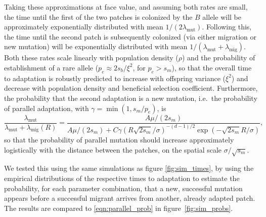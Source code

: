\documentclass{article}
\newcommand{\migrate}{\lambda_\text{mig}}
\newcommand{\mutrate}{\lambda_\text{mut}}
\begin{document}
Taking these approximations at face value, 
and assuming both rates are small, 
the time until the first of the two patches is colonized by the $B$
allele will be approximately exponentially distributed with mean $1/(2
\mutrate)$.
Following this, the time until the second patch is subsequently colonized 
(via either migration or new mutation) 
will be exponentially distributed with mean $1/(\mutrate+\migrate)$.
Both these rates scale linearly with population density ($\rho$) 
and the probability of establishment of a rare allele ($p_e\approx 2 s_b/\xi^2$, for $p_e>s_m$),
so that the overall time to adaptation is robustly predicted to increase with offspring variance ($\xi^2$)
and decrease with population density and beneficial selection coefficient.
Furthermore, the probability that the second adaptation is a new mutation,
i.e.\ the probability of parallel adaptation, 
with $\gamma = \min(1,s_m/p_e)$,
is 
\begin{equation} \label{eqn:parallel_prob}
    \frac{\mutrate}{\mutrate+\migrate(R)} = \frac{ A \mu / (2s_m) }{ A \mu / (2s_m) + C \gamma \left(R \sqrt{2 s_m} /\sigma \right)^{-(d-1)/2}\exp\left(- \sqrt{2 s_m} R / \sigma \right) },  
\end{equation}
so that the probability of parallel mutation should increase
approximately logistically with the distance between the patches, on the spatial scale $\sigma/\sqrt{s_m}$. 

We tested this using the same simulations as figure \ref{fig:sim_times},
by using the empirical distributions of the respective times to adaptation
to estimate the probability,
for each parameter combination,
that a new, successful mutation appears 
before a successful migrant arrives from another, already adapted patch.
The results are compared to \eqref{eqn:parallel_prob}
in figure~\ref{fig:sim_probs}.
\end{document}
